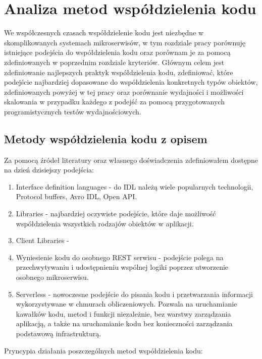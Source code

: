 \documentclass[runningheads,12pt]{llncs} \usepackage{graphicx} \usepackage{todonotes} \usepackage{fancyhdr} \usepackage{lipsum} \usepackage[T1]{fontenc} \usepackage[provide=*,english,polish]{babel}
\begin{document}
\newpage

\section{Analiza metod współdzielenia kodu}

We współczesnych czasach współdzielenie kodu jest niezbędne w skomplikowanych systemach mikroserwisów, w tym rozdziale pracy porównuję istniejące podejścia do współdzielenia kodu oraz porównam je za pomocą zdefiniowanych w poprzednim rozdziale kryteriów. Głównym celem jest zdefiniowanie najlepszych praktyk współdzielenia kodu, zdefiniować, które podejście najbardziej dopasowane do współdzielenia konkretnych typów obiektów, zdefiniowanych powyżej w tej pracy oraz porównanie wydajności i możliwości skalowania w przypadku każdego z podejść za pomocą przygotowanych programistycznych testów wydajnościowych.

\subsection{Metody współdzielenia kodu z opisem} 

Za pomocą źródeł literatury oraz własnego doświadczenia zdefiniowałem dostępne na dzień dzisiejszy podejścia: 

\begin{enumerate} 
    \item Interface definition languages - do IDL należą wiele popularnych technologii, Protocol buffers, Avro IDL, Open API. ~\cite{wiki:interface_description_language}
    \item Libraries - najbardziej oczywiste podejście, które daje możliwość współdzielenia wszystkich rodzajów obiektów w aplikacji. 
    \item Client Libraries - 
    \item Wyniesienie kodu do osobnego REST serwisu - podejście polega na przechwytywaniu i udostępnieniu wspólnej logiki poprzez utworzenie osobnego mikroserwisu.
    \item Serverless - nowoczesne podejście do pisania kodu i przetwarzania informacji wykorzystywane w chmurach obliczeniowych. Pozwala na uruchamianie kawałków kodu, metod i funkcji niezależnie, bez warstwy zarządzania aplikacją, a także na uruchamianie kodu bez konieczności zarządzania podstawową infrastrukturą. ~\cite{ibm_serverless}
\end{enumerate}

Pryncypia działania poszczególnych metod współdzielenia kodu:
\end{document}
